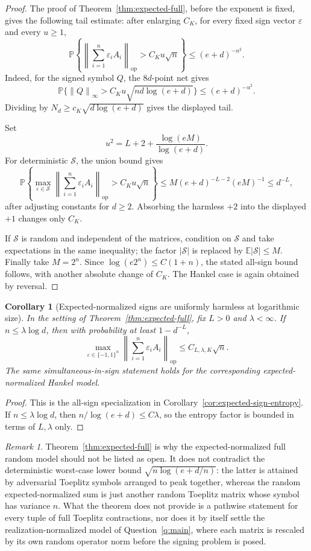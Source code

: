 \documentclass[11pt]{amsart}
\numberwithin{equation}{section}
\newtheorem{corollary}[theorem]{Corollary}
\theoremstyle{definition}
\theoremstyle{remark}
\newtheorem{remark}[theorem]{Remark}
\newcommand{\op}{\mathrm{op}}
\newcommand{\Prob}{\mathbb P}
\newcommand{\Exp}{\mathbb E}
\newcommand{\norm}[1]{\left\lVert #1\right\rVert}
\newcommand{\abs}[1]{\left\lvert #1\right\rvert}
\newcommand{\eps}{\varepsilon}
\begin{document}
\begin{proof}
The proof of Theorem~\ref{thm:expected-full}, before the exponent is fixed,
gives the following tail estimate: after enlarging \(C_K\), for every fixed
sign vector \(\eps\) and every \(u\ge1\),
\[
  \Prob\left\{
  \norm{\sum_{i=1}^n\eps_iA_i}_{\op}>C_Ku\sqrt n
  \right\}
  \le (e+d)^{-u^2}.
\]
Indeed, for the signed symbol \(Q\), the \(8d\)-point net gives
\[
  \Prob\{\norm{Q}_\infty>C_Ku\sqrt{nd\log(e+d)}\}
  \le (e+d)^{-u^2}.
\]
Dividing by \(N_d\ge c_K\sqrt{d\log(e+d)}\) gives the displayed tail.

Set
\[
  u^2=L+2+\frac{\log(eM)}{\log(e+d)} .
\]
For deterministic \(\mathcal S\), the union bound gives
\[
  \Prob\left\{
  \max_{\eps\in\mathcal S}
  \norm{\sum_{i=1}^n\eps_iA_i}_{\op}>C_Ku\sqrt n
  \right\}
  \le
  M(e+d)^{-L-2}(eM)^{-1}
  \le d^{-L},
\]
after adjusting constants for \(d\ge2\).  Absorbing the harmless \(+2\) into
the displayed \(+1\) changes only \(C_K\).

If \(\mathcal S\) is random and independent of the matrices, condition on
\(\mathcal S\) and take expectations in the same inequality; the factor
\(\abs{\mathcal S}\) is replaced by \(\Exp\abs{\mathcal S}\le M\).
Finally take \(M=2^n\). Since
\(\log(e2^n)\le C(1+n)\), the stated all-sign bound follows, with another
absolute change of \(C_K\).  The Hankel case is again obtained by reversal.
\end{proof}

\begin{corollary}[Expected-normalized signs are uniformly harmless at logarithmic size]
\label{cor:expected-all-signs}
In the setting of Theorem~\ref{thm:expected-full}, fix \(L>0\) and
\(\lambda<\infty\).  If \(n\le\lambda\log d\), then with probability at least
\(1-d^{-L}\),
\[
  \max_{\eps\in\{-1,1\}^n}
  \norm{\sum_{i=1}^n\eps_iA_i}_{\op}
  \le C_{L,\lambda,K}\sqrt n .
\]
The same simultaneous-in-sign statement holds for the corresponding
expected-normalized Hankel model.
\end{corollary}

\begin{proof}
This is the all-sign specialization in
Corollary~\ref{cor:expected-sign-entropy}.  If \(n\le\lambda\log d\), then
\(n/\log(e+d)\le C\lambda\), so the entropy factor is bounded in terms of
\(L,\lambda\) only.
\end{proof}

\begin{remark}\label{rem:edge-low-freq}
Theorem~\ref{thm:expected-full} is why the expected-normalized full random model
should not be listed as open.  It does not contradict the deterministic
worst-case lower bound \(\sqrt{n\log(e+d/n)}\): the latter is attained by
adversarial Toeplitz symbols arranged to peak together, whereas the random
expected-normalized sum is just another random Toeplitz matrix whose symbol has
variance \(n\).  What the theorem does not provide is a pathwise statement for
every tuple of full Toeplitz contractions, nor does it by itself settle the
realization-normalized model of Question~\ref{q:main}, where each matrix is
rescaled by its own random operator norm before the signing problem is posed.
\end{remark}
\end{document}
